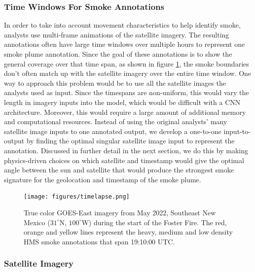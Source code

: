 \documentclass{article}
\begin{document}
\subsubsection*{Time Windows For Smoke Annotations}

In order to take into account movement characteristics to help identify smoke, analysts use multi-frame animations of the satellite imagery. The resulting annotations often have large time windows over multiple hours to represent one smoke plume annotation. Since the goal of these annotations is to show the general coverage over that time span, as shown in figure \ref{timelapse}, the smoke boundaries don't often match up with the satellite imagery over the entire time window. One way to approach this problem would be to use all the satellite images the analysts used as input. Since the timespans are non-uniform, this would vary the length in imagery inputs into the model, which would be difficult with a CNN architecture. Moreover, this would require a large amount of additional memory and computational resources. Instead of using the original analysts' many satellite image inputs to one annotated output, we develop a one-to-one input-to-output by finding the optimal singular satellite image input to represent the annotation. Discussed in further detail in the next section, we do this by making physics-driven choices on which satellite and timestamp would give the optimal angle between the sun and satellite that would produce the strongest smoke signature for the geolocation and timestamp of the smoke plume.


\begin{figure} \label{timelapse}
    \centering
    \texttt{[image: figures/timelapse.png]}
    \caption{True color GOES-East imagery from May 2022, Southeast New Mexico (\(31^{\circ}\)N, \(100^{\circ}\)W) during the start of the Foster Fire. The red, orange and yellow lines represent the heavy, medium and low density HMS smoke annotations that span 19:10:00 UTC.}
\end{figure}


\subsubsection*{Satellite Imagery} 
\end{document}
